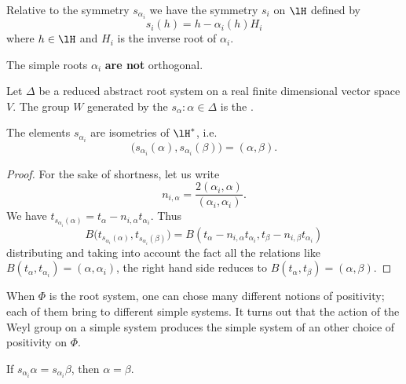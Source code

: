 Relative to the symmetry \( s_{\alpha_i}\) we have the symmetry \( s_i\) on \( \lH\) defined by
\begin{equation}        \label{EqSymsiReltosalphai}
    s_i(h)=h-\alpha_i(h)H_i
\end{equation}
where \( h\in\lH\) and \( H_i\) is the inverse root of \( \alpha_i\).

\begin{remark}
    The simple roots \( \alpha_i\) {\bf are not} orthogonal.
\end{remark}

Let $\Delta$ be a reduced abstract root system on a real finite dimensional vector space $V$. The group $W$ generated by the $s_{\alpha}:\alpha\in\Delta$ is the .

\begin{proposition}     \label{PropWeylIsomalphai}
    The elements \( s_{\alpha_i}\) are isometries of \( \lH^*\), i.e.
    \begin{equation}
        \big( s_{\alpha_i}(\alpha),s_{\alpha_i}(\beta) \big)=(\alpha,\beta).
    \end{equation}
\end{proposition}

\begin{proof}
    For the sake of shortness, let us write
    \begin{equation}
        n_{i,\alpha}=\frac{ 2(\alpha_i,\alpha) }{ (\alpha_i,\alpha_i) }.
    \end{equation}
    We have \( t_{s_{\alpha_i}(\alpha)}=t_{\alpha}-n_{i,\alpha}t_{\alpha_i}\). Thus
    \begin{equation}
        B\big( t_{s_{\alpha_i}(\alpha)}, t_{s_{\alpha_i}(\beta)} \big)=B(t_{\alpha}-n_{i,\alpha}t_{\alpha_i},t_{\beta}-n_{i,\beta}t_{\alpha_i})
    \end{equation}
    distributing and taking into account the fact all the relations like \( B(t_{\alpha},t_{\alpha_i})=(\alpha,\alpha_i)\), the right hand side reduces to \( B(t_{\alpha},t_{\beta})=(\alpha,\beta)\).
\end{proof}

When \( \Phi\) is the root system, one can chose many different notions of positivity; each of them bring to different simple systems. It turns out that the action of the Weyl group on a simple system produces the simple system of an other choice of positivity on \( \Phi\).

\begin{lemma}       \label{LemalphajsPhipinjsasbab}
    If \( s_{\alpha_i}\alpha=s_{\alpha_i}\beta\), then \( \alpha=\beta\).
\end{lemma}


